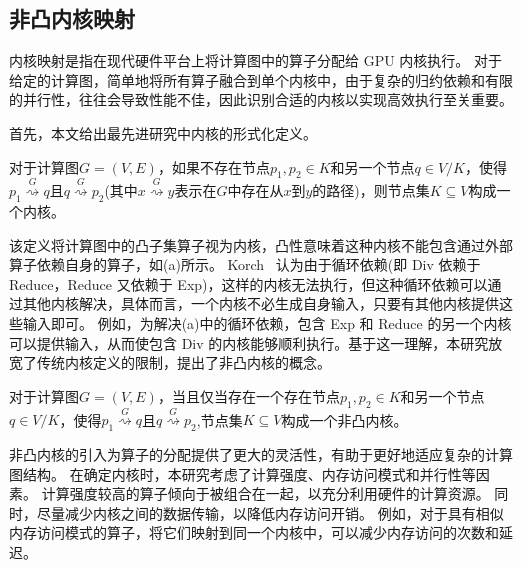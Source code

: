 \subsection{非凸内核映射}
内核映射是指在现代硬件平台上将计算图中的算子分配给 GPU 内核执行。
对于给定的计算图，简单地将所有算子融合到单个内核中，由于复杂的归约依赖和有限的并行性，往往会导致性能不佳，因此识别合适的内核以实现高效执行至关重要。

首先，本文给出最先进研究中内核的形式化定义。

\vspace{0.5em}
\begin{definition}[内核] 对于计算图\(G=(V, E)\)，如果不存在节点\(p_{1}, p_{2} \in K\)和另一个节点\(q \in V/K\)，使得\(p_{1} \stackrel{G}{\rightsquigarrow } q\)且\(q \stackrel{G}{\rightsquigarrow} p_{2}\)(其中\(x \stackrel{G}{\rightsquigarrow} y\)表示在\(G\)中存在从\(x\)到\(y\)的路径)，则节点集\(K \subseteq V\)构成一个内核。
\end{definition}
\vspace{0.5em}

该定义将计算图中的凸子集算子视为内核，凸性意味着这种内核不能包含通过外部算子依赖自身的算子，如(a)所示。
Korch~\cite{hu2024korch} 认为由于循环依赖(即 Div 依赖于 Reduce，Reduce 又依赖于 Exp)，这样的内核无法执行，但这种循环依赖可以通过其他内核解决，具体而言，一个内核不必生成自身输入，只要有其他内核提供这些输入即可。
例如，为解决(a)中的循环依赖，包含 Exp 和 Reduce 的另一个内核可以提供输入，从而使包含 Div 的内核能够顺利执行。基于这一理解，本研究放宽了传统内核定义的限制，提出了非凸内核的概念。

\vspace{0.5em}
\begin{definition}[非凸内核] 对于计算图\(G=(V, E)\)，当且仅当存在一个存在节点\(p_{1}, p_{2} \in K\)和另一个节点\(q \in V/K\)，使得\(p_{1} \stackrel{G}{\rightsquigarrow } q\)且\(q \stackrel{G}{\rightsquigarrow} p_{2}\),节点集\(K \subseteq V\)构成一个非凸内核。
\end{definition}
\vspace{0.5em}

非凸内核的引入为算子的分配提供了更大的灵活性，有助于更好地适应复杂的计算图结构。
在确定内核时，本研究考虑了计算强度、内存访问模式和并行性等因素。
计算强度较高的算子倾向于被组合在一起，以充分利用硬件的计算资源。
同时，尽量减少内核之间的数据传输，以降低内存访问开销。
例如，对于具有相似内存访问模式的算子，将它们映射到同一个内核中，可以减少内存访问的次数和延迟。

